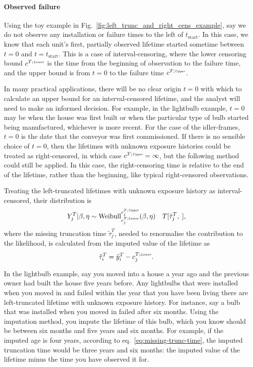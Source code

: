 \paragraph*{Observed failure}
Using the toy example in Fig.~\ref{fig:left_trunc_and_right_cens_example}, say we do not observe any installation or failure times to the left of $t_\text{start}$. In this case, we know that each unit's first, partially observed lifetime started sometime between $t = 0$ and $t = t_\text{start}$. This is a case of interval-censoring, where the lower censoring bound $c^{T;\textit{\tiny{Lower}}}$ is the time from the beginning of observation to the failure time, and the upper bound is from $t = 0$ to the failure time $c^{T;\textit{\tiny{Upper}}}$.

In many practical applications, there will be no clear origin $t = 0$ with which to calculate an upper bound for an interval-censored lifetime, and the analyst will need to make an informed decision. For example, in the lightbulb example, $t = 0$ may be when the house was first built or when the particular type of bulb started being manufactured, whichever is more recent. For the case of the idler-frames, $t = 0$ is the date that the conveyor was first commissioned. If there is no sensible choice of $t = 0$, then the lifetimes with unknown exposure histories could be treated as right-censored, in which case $c^{T;\textit{\tiny{Upper}}} = \infty$, but the following method could still be applied. In this case, the right-censoring time is relative to the end of the lifetime, rather than the beginning, like typical right-censored observations.

Treating the left-truncated lifetimes with unknown exposure history as interval-censored, their distribution is
\begin{equation}
    Y^T_j|\beta, \eta \sim \hbox{Weibull}^{c^{T;\textit{\tiny{Upper}}}_{j}}_{c^{T;\textit{\tiny{Lower}}}_{j}}(\beta, \eta) \quad T[\tilde{\tau}^{T}_j, \;],
\end{equation}
where the missing truncation time $\tilde{\tau}^{T}_j$, needed to renormalise the contribution to the likelihood, is calculated from the imputed value of the lifetime as
\begin{equation}
    \label{eq:missing-trunc-time}
   \tilde{\tau}^T_i = \tilde{y}^T_i - c^{T;\textit{\tiny{Lower}}}_{j}.
\end{equation}

In the lightbulb example, say you moved into a house a year ago and the previous owner had built the house five years before. Any lightbulbs that were installed when you moved in and failed within the year that you have been living there are left-truncated lifetime with unknown exposure history. For instance, say a bulb that was installed when you moved in failed after six months. Using the imputation method, you impute the lifetime of this bulb, which you know should be between six months and five years and six months. For example, if the imputed age is four years, according to eq.~\eqref{eq:missing-trunc-time}, the imputed truncation time would be three years and six months: the imputed value of the lifetime minus the time you have observed it for.


